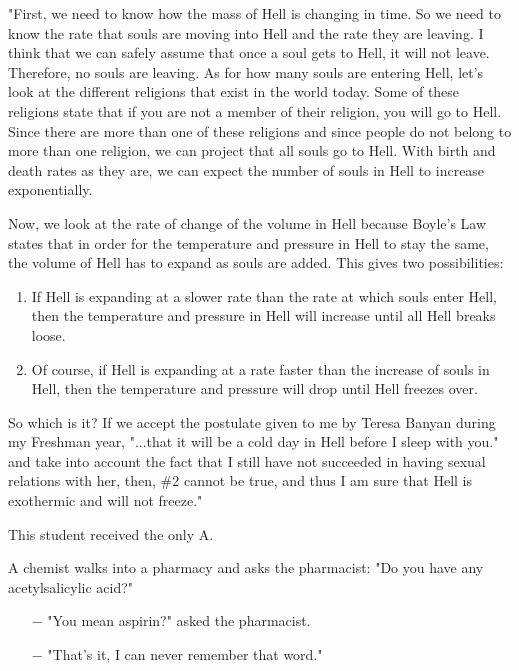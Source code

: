 	"First, we need to know how the mass of Hell is changing in time. So we need to know the rate that souls are moving into Hell and the rate they are leaving. I think that we can safely assume that once a soul gets to Hell, it will not leave. Therefore, no souls are leaving. As for how many souls are entering Hell, let's look at the different religions that exist in the world today. Some of these religions state that if you are not a member of their religion, you will go to Hell. Since there are more than one of these religions and since people do not belong to more than one religion, we can project that all souls go to Hell. With birth and death rates as they are, we can expect the number of souls in Hell to increase exponentially.
	
	Now, we look at the rate of change of the volume in Hell because Boyle's Law states that in order for the temperature and pressure in Hell to stay the same, the volume of Hell has to expand as souls are added. This gives two possibilities:
	
	\begin{enumerate}
		\item If Hell is expanding at a slower rate than the rate at which souls enter Hell, then the temperature and pressure in Hell will increase until all Hell breaks loose.
	
		\item Of course, if Hell is expanding at a rate faster than the increase of souls in Hell, then the temperature and pressure will drop until Hell freezes over.
	\end{enumerate}
	
	So which is it? If we accept the postulate given to me by Teresa Banyan during my Freshman year, "...that it will be a cold day in Hell before I sleep with you." and take into account the fact that I still have not succeeded in having sexual relations with her, then, \#2 cannot be true, and thus I am sure that Hell is exothermic and will not freeze."
	
	This student received the only A.
	\begin{center}\underline{\hspace{5 cm}}\end{center}
	
	A chemist walks into a pharmacy and asks the pharmacist: "Do you have any acetylsalicylic acid?"
	
	\begin{itemize}
		\item[$-$] "You mean aspirin?" asked the pharmacist.
	
		\item[$-$] "That's it, I can never remember that word."
	\end{itemize}
	

